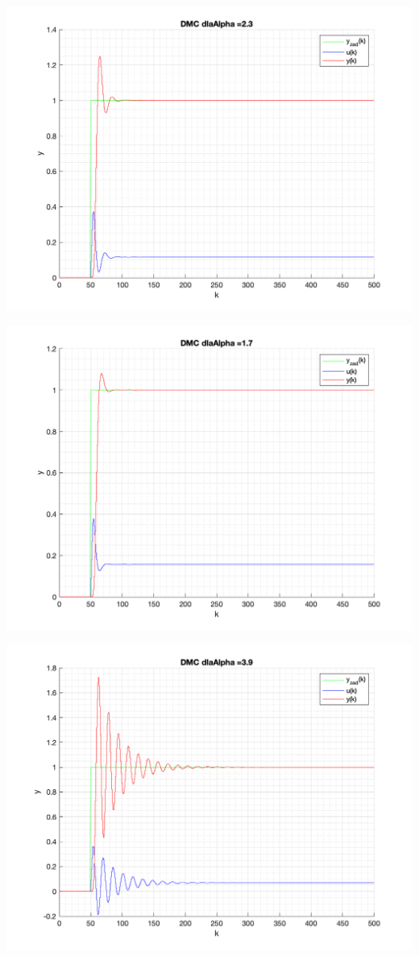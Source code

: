 \documentclass[a4paper, 11pt]{article}
\begin{document}
\begin{enumerate}
 \includegraphics[width=\linewidth]{./ModelsDodatkowe_Alpha/P4_DMC_Alpha_2_3_png.png} 
 
 \includegraphics[width=\linewidth]{./ModelsDodatkowe_Alpha/P4_DMC_Alpha_1_7_png.png} 
 
 \includegraphics[width=\linewidth]{./ModelsDodatkowe_Alpha/P4_DMC_Alpha_3_9_png.png} 
 

\end{enumerate}
\end{document}
